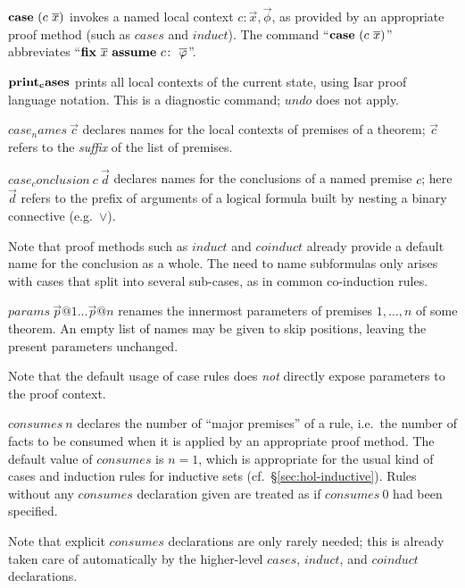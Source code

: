 \begin{descr}
  
\item [${\mathord{\mathbf{case}}}~(c~\overline{x})$] invokes a named local context $c\colon \vec x,
  \vec \phi$, as provided by an appropriate proof method (such as $cases$ and
  $induct$).  The command ``${\mathord{\mathbf{case}}}~(c~\overline{x})$'' abbreviates ``$\FIX{\vec
    x}~\ASSUME{c}{\vec\phi}$''.

\item [${\mathord{\mathbf{print_cases}}}$] prints all local contexts of the current
  state, using Isar proof language notation.  This is a diagnostic command;
  $undo$ does not apply.
  
\item [$case_names~\vec c$] declares names for the local contexts of premises
  of a theorem; $\vec c$ refers to the \emph{suffix} of the list of premises.
  
\item [$case_conclusion~c~\vec d$] declares names for the conclusions of a
  named premise $c$; here $\vec d$ refers to the prefix of arguments of a
  logical formula built by nesting a binary connective (e.g.\ $\lor$).
  
  Note that proof methods such as $induct$ and $coinduct$ already provide a
  default name for the conclusion as a whole.  The need to name subformulas
  only arises with cases that split into several sub-cases, as in common
  co-induction rules.

\item [$params~\vec p@1 \dots \vec p@n$] renames the innermost parameters of
  premises $1, \dots, n$ of some theorem.  An empty list of names may be given
  to skip positions, leaving the present parameters unchanged.
  
  Note that the default usage of case rules does \emph{not} directly expose
  parameters to the proof context.
  
\item [$consumes~n$] declares the number of ``major premises'' of a rule,
  i.e.\ the number of facts to be consumed when it is applied by an
  appropriate proof method.  The default value of $consumes$ is $n = 1$, which
  is appropriate for the usual kind of cases and induction rules for inductive
  sets (cf.\ \S\ref{sec:hol-inductive}).  Rules without any $consumes$
  declaration given are treated as if $consumes~0$ had been specified.
  
  Note that explicit $consumes$ declarations are only rarely needed; this is
  already taken care of automatically by the higher-level $cases$, $induct$,
  and $coinduct$ declarations.

\end{descr}


